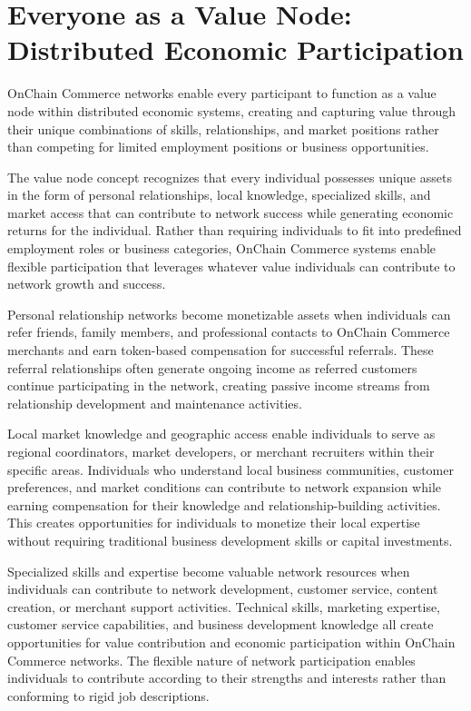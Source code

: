 \documentclass[
  Letterpaper,
]{scrbook}
\begin{document}
\section{Everyone as a Value Node: Distributed Economic
Participation}\label{everyone-as-a-value-node-distributed-economic-participation}

OnChain Commerce networks enable every participant to function as a
value node within distributed economic systems, creating and capturing
value through their unique combinations of skills, relationships, and
market positions rather than competing for limited employment positions
or business opportunities.

The value node concept recognizes that every individual possesses unique
assets in the form of personal relationships, local knowledge,
specialized skills, and market access that can contribute to network
success while generating economic returns for the individual. Rather
than requiring individuals to fit into predefined employment roles or
business categories, OnChain Commerce systems enable flexible
participation that leverages whatever value individuals can contribute
to network growth and success.

Personal relationship networks become monetizable assets when
individuals can refer friends, family members, and professional contacts
to OnChain Commerce merchants and earn token-based compensation for
successful referrals. These referral relationships often generate
ongoing income as referred customers continue participating in the
network, creating passive income streams from relationship development
and maintenance activities.

Local market knowledge and geographic access enable individuals to serve
as regional coordinators, market developers, or merchant recruiters
within their specific areas. Individuals who understand local business
communities, customer preferences, and market conditions can contribute
to network expansion while earning compensation for their knowledge and
relationship-building activities. This creates opportunities for
individuals to monetize their local expertise without requiring
traditional business development skills or capital investments.

Specialized skills and expertise become valuable network resources when
individuals can contribute to network development, customer service,
content creation, or merchant support activities. Technical skills,
marketing expertise, customer service capabilities, and business
development knowledge all create opportunities for value contribution
and economic participation within OnChain Commerce networks. The
flexible nature of network participation enables individuals to
contribute according to their strengths and interests rather than
conforming to rigid job descriptions.
\end{document}
